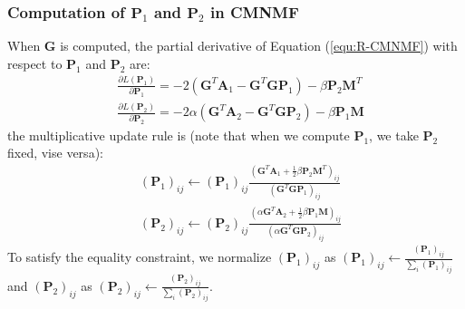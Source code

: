 \documentclass{bmcart}
\begin{document}
\subsubsection*{\textbf{Computation of $\bm{P}_1$ and $\bm{P}_2$ in CMNMF}}
When $\bm{G}$ is computed,
the partial derivative of Equation (\ref{equ:R-CMNMF}) with respect to $\bm{P}_1$ and $\bm{P}_2$ are:
\begin{equation}\label{equ:P1_gradient}\nonumber
\begin{split}
&\frac{\partial{L(\bm{P}_1)}}{\partial{\bm{P}_1}}=
-2(\bm{G}^T\bm{A}_1-{\bm{G}^T\bm{GP}_1})-\beta \bm{P}_2\bm{M}^T %
\\
&\frac{\partial{L(\bm{P}_2)}}{\partial{\bm{P}_2}}=
-2\alpha(\bm{G}^T\bm{A}_2-{\bm{G}^T\bm{GP}_2})-\beta \bm{P}_1\bm{M} %
\end{split}
\end{equation}
the multiplicative update rule is (note that when we compute $\bm{P}_1$, we take $\bm{P}_2$ fixed, vise versa):
\begin{equation}\label{updating_P}\nonumber
\begin{split}
&(\bm{P}_1)_{ij}\leftarrow (\bm{P}_1)_{ij}
\frac{(\bm{G}^T\bm{A}_1+\frac{1}{2}\beta \bm{P}_2\bm{M}^T)_{ij}}
{(\bm{G}^T\bm{GP}_1
)_{ij}}\\
&(\bm{P}_2)_{ij}\leftarrow (\bm{P}_2)_{ij}
\frac{(\alpha \bm{G}^T\bm{A}_2+\frac{1}{2}\beta \bm{P}_1\bm{M})_{ij}}
{(\alpha \bm{G}^T\bm{GP}_2
)_{ij}}
\end{split}
\end{equation}
To satisfy the equality constraint, we normalize $(\bm{P}_1)_{ij}$ as $(\bm{P}_1)_{ij}\leftarrow \frac{(\bm{P}_1)_{ij}}{\sum_{i}(\bm{P}_1)_{ij}}
$ and $(\bm{P}_2)_{ij}$ as $(\bm{P}_2)_{ij}\leftarrow \frac{(\bm{P}_2)_{ij}}{\sum_{i}(\bm{P}_2)_{ij}}$.
\end{document}
